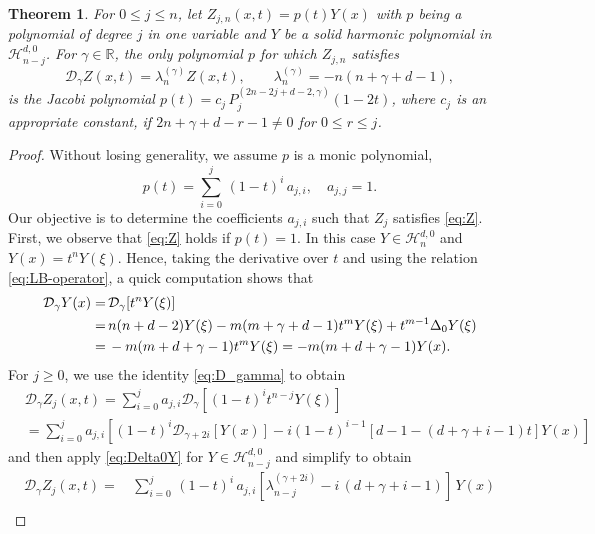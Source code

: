 \documentclass{amsart}
\newtheorem{thm}{Theorem}[section]
\theoremstyle{remark}
\def\g{{\gamma}}
\def\l{{\lambda}}
\def\CD{{\mathcal D}}
\def\CH{{\mathcal H}}
\def\RR{{\mathbb R}}
\begin{document}
\begin{thm}\label{thm:Z}
For $0\le  j \le n$, let $Z_{j,n}(x,t) = p(t) Y(x)$ with $p$ being a polynomial of degree $j$ in one variable and
$Y$ be a solid harmonic polynomial in $\CH_{n-j}^{d,0}$. For $\gamma \in \RR$, the only polynomial $p$ for
which $Z_{j,n}$ satisfies
\begin{equation}\label{eq:Z}
     \CD_{\g} Z (x,t) = \lambda_n^{(\gamma)} Z(x,t),  \qquad \l_n^{(\g)} =  -n(n+\g+d-1),
\end{equation}
is the Jacobi polynomial $p(t) = c_j\,P_j^{(2n-2j+d-2, \gamma)}(1-2t)$, where $c_j$ is an appropriate constant,
if $2n+\gamma+d-r-1\neq 0$ for $0\leq r\leq j$.
\end{thm}

\begin{proof}
Without losing generality, we assume $p$ is a monic polynomial,
$$
p(t) = \sum_{i=0}^j \,(1-t)^i\,a_{j,i}, \quad a_{j,j} = 1.
$$
Our objective is to determine the coefficients $a_{j,i}$ such that $Z_j$ satisfies \eqref{eq:Z}. First, we observe
that \eqref{eq:Z} holds if $p(t) =1$. In this case $Y \in \CH_n^{d,0}$ and $Y(x) = t^n Y(\xi)$. Hence, taking
the derivative over $t$ and using the relation \eqref{eq:LB-operator}, a quick computation shows that
\begin{align} \label{eq:Delta0Y}
\CD_{\g} Y(x)= &\, \CD_{\g}[t^n Y(\xi)] \\
 = &\, n (n+d-2)Y(\xi) - m (m+\g+d-1) t^m Y(\xi) + t^{m-1}  \Delta_0 Y(\xi) \notag \\
 =  &\, -m(m+d+\g-1) t^m Y(\xi) = -m(m+d+\g-1) Y(x). \notag
\end{align}
For $j \ge 0$, we use the identity \eqref{eq:D_gamma} to obtain
\begin{align*}
& \CD_{\g} Z_j(x,t)  =  \sum_{i=0}^j  a_{j,i} \CD_{\g}\left[(1-t)^i t^{n-j} Y(\xi)\right] \\
& = \sum_{i=0}^j  a_{j,i} \left[(1-t)^i \CD_{\g+ 2i}[Y(x)] - i(1-t)^{i-1}[d-1-(d+\gamma+i-1)t]  Y(x)\right]
\end{align*}
and then apply \eqref{eq:Delta0Y} for $Y\in \CH_{n-j}^{d,0}$ and simplify to obtain
\begin{align*}
\CD_{\g} Z_j(x,t)  =
\, & \sum_{i=0}^{j} \,(1-t)^i \,a_{j,i} [\lambda_{n-j}^{(\gamma+2i)} - i\,(d+\gamma+i-1)]\,Y(x)\\

\end{align*}
\end{proof}
\end{document}
